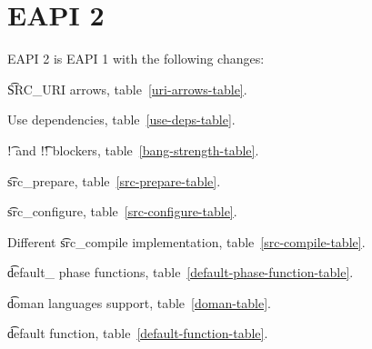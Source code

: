 \section*{EAPI 2}

EAPI 2 is EAPI 1 with the following changes:

\begin{compactitem}
\item \t{SRC\_URI} arrows, table~\ref{uri-arrows-table}.
\item Use dependencies, table~\ref{use-deps-table}.
\item \t{!} and \t{!!} blockers, table~\ref{bang-strength-table}.
\item \t{src\_prepare}, table~\ref{src-prepare-table}.
\item \t{src\_configure}, table~\ref{src-configure-table}.
\item Different \t{src\_compile} implementation, table~\ref{src-compile-table}.
\item \t{default\_} phase functions, table~\ref{default-phase-function-table}.
\item \t{doman} languages support, table~\ref{doman-table}.
\item \t{default} function, table~\ref{default-function-table}.
\end{compactitem}


